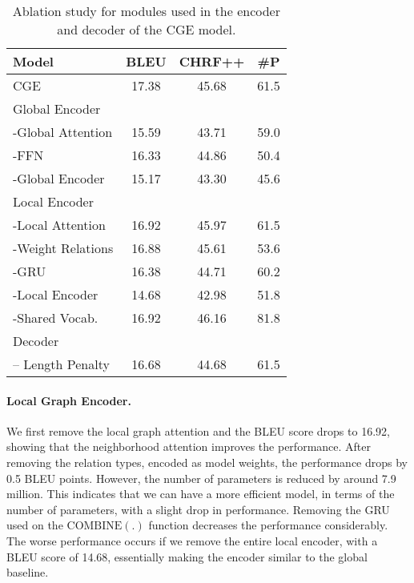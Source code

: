 \documentclass[11pt,a4paper]{article}
\begin{document}
\begin{table}[t]
\centering
{\renewcommand{\arraystretch}{0.8}
\setlength{\belowrulesep}{1.3pt}
\setlength{\aboverulesep}{0pt}
\begin{tabular}{@{\hspace*{1.8mm}}lccc@{\hspace*{1.8mm}}}  
\toprule
\textbf{Model} & \textbf{BLEU} & \textbf{CHRF++} &  \textbf{\#P}   \\
\midrule
CGE & 17.38 & 45.68 & 61.5 \\
\midrule
Global Encoder &  & &  \\
 -Global Attention & 15.59 & 43.71 & 59.0 \\
 -FFN & 16.33 & 44.86 & 50.4 \\
 -Global Encoder & 15.17 & 43.30 & 45.6 \\
\midrule
Local Encoder &  & &  \\
 -Local Attention & 16.92 & 45.97 & 61.5 \\
 -Weight Relations & 16.88 & 45.61 & 53.6 \\
 -GRU & 16.38 & 44.71 & 60.2 \\
 -Local Encoder & 14.68 & 42.98 & 51.8  \\
 \midrule
 -Shared Vocab. & 16.92 & 46.16 & 81.8 \\
\midrule
 Decoder &  & & \\
 -- Length Penalty & 16.68 & 44.68 & 61.5 \\
\bottomrule
\end{tabular}}
\caption{Ablation study for modules used in the encoder and decoder of the {\selectfont CGE} model.}
\label{tab:ablation}
\end{table}



\paragraph{Local Graph Encoder.} We first remove the local graph attention and the BLEU score drops to 16.92, showing that the neighborhood attention improves the performance. After removing the relation types, encoded as model weights, the performance drops by 0.5 BLEU points. However, the number of parameters is reduced by around 7.9 million. This indicates that we can have a more efficient model, in terms of the number of parameters, with a slight drop in performance. Removing the GRU used on the $\textrm{COMBINE}(.)$ function decreases the performance considerably. The worse performance occurs if we remove the entire local encoder, with a BLEU score of 14.68, essentially making the encoder similar to the global baseline.
\end{document}
